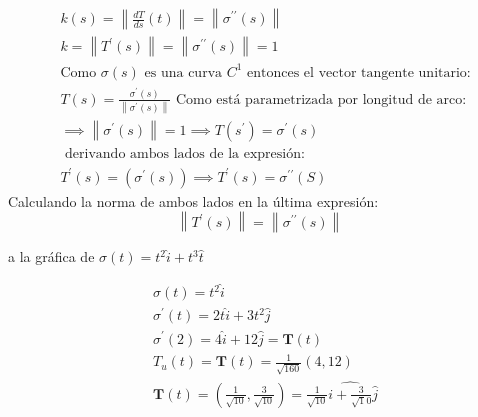 \begin{align*}
	 & k(s)=\left\lVert \frac{dT}{ds}(t)\right\rVert=\left\lVert \sigma^{\prime\prime}(s)\right\rVert                                  \\
	 & k=\left\lVert T^{\prime}(s)\right\rVert=\left\lVert \sigma^{\prime\prime}(s)\right\rVert=1                                      \\
	 & \text{Como }\sigma(s) \text{ es una curva }C^1\text{ entonces el vector tangente unitario:}                                     \\
	 & T(s)=\frac{\sigma^{\prime}(s)}{\left\lVert \sigma^{\prime}(s)\right\rVert}\text{ Como está parametrizada por longitud de arco:} \\
	 & \implies\left\lVert \sigma^{\prime}(s)\right\rVert=1\implies T(s^{\prime})=\sigma^{\prime}(s)                                   \\
	 & \text{ derivando ambos lados de la expresión:}                                                                                  \\
	 & T^{\prime}(s)=\left(\sigma^{\prime}(s)\right)\implies T^{\prime}(s)=\sigma^{\prime\prime}(S)
\end{align*}
Calculando la norma de ambos lados en la última expresión:
\begin{equation}
	\left\lVert T^{\prime}(s)\right\rVert=\left\lVert \sigma^{\prime\prime}(s)\right\rVert
\end{equation}


\begin{problem}
a la gráfica de $\sigma(t)=t^2\hat{i}+t^3\hat{t}$
\end{problem}

\begin{align*}
	 & \sigma(t)=t^2\hat{i}                                                                                                       \\
	 & \sigma^{\prime}(t)=2t\hat{i}+3t^2\hat{j}                                                                                   \\
	 & \sigma^{\prime}(2)=4\hat{i}+12\hat{j}=\boldsymbol{T}(t)                                                                    \\
	 & T_u(t)=\boldsymbol{T}(t)=\frac{1}{\sqrt{160}}(4,12)                                                                        \\
	 & \boldsymbol{T}(t)=\left(\frac{1}{\sqrt{10}},\frac{3}{\sqrt{10}}\right)=\frac{1}{\sqrt{10}}\hat{i+\frac{3}{\sqrt10}}\hat{j}
\end{align*}

